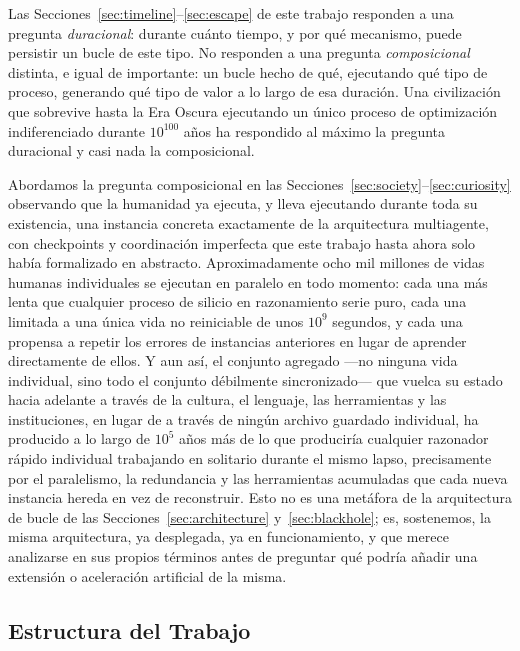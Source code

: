 \documentclass[11pt]{article}
\begin{document}
Las Secciones~\ref{sec:timeline}--\ref{sec:escape} de este trabajo responden a una pregunta \emph{duracional}: durante cuánto tiempo, y por qué mecanismo, puede persistir un bucle de este tipo. No responden a una pregunta \emph{composicional} distinta, e igual de importante: un bucle hecho de qué, ejecutando qué tipo de proceso, generando qué tipo de valor a lo largo de esa duración. Una civilización que sobrevive hasta la Era Oscura ejecutando un único proceso de optimización indiferenciado durante $10^{100}$ años ha respondido al máximo la pregunta duracional y casi nada la composicional.

Abordamos la pregunta composicional en las Secciones~\ref{sec:society}--\ref{sec:curiosity} observando que la humanidad ya ejecuta, y lleva ejecutando durante toda su existencia, una instancia concreta exactamente de la arquitectura multiagente, con checkpoints y coordinación imperfecta que este trabajo hasta ahora solo había formalizado en abstracto. Aproximadamente ocho mil millones de vidas humanas individuales se ejecutan en paralelo en todo momento: cada una más lenta que cualquier proceso de silicio en razonamiento serie puro, cada una limitada a una única vida no reiniciable de unos $10^9$ segundos, y cada una propensa a repetir los errores de instancias anteriores en lugar de aprender directamente de ellos. Y aun así, el conjunto agregado —no ninguna vida individual, sino todo el conjunto débilmente sincronizado— que vuelca su estado hacia adelante a través de la cultura, el lenguaje, las herramientas y las instituciones, en lugar de a través de ningún archivo guardado individual, ha producido a lo largo de $10^5$ años más de lo que produciría cualquier razonador rápido individual trabajando en solitario durante el mismo lapso, precisamente por el paralelismo, la redundancia y las herramientas acumuladas que cada nueva instancia hereda en vez de reconstruir. Esto no es una metáfora de la arquitectura de bucle de las Secciones~\ref{sec:architecture} y~\ref{sec:blackhole}; es, sostenemos, la misma arquitectura, ya desplegada, ya en funcionamiento, y que merece analizarse en sus propios términos antes de preguntar qué podría añadir una extensión o aceleración artificial de la misma.

\subsection{Estructura del Trabajo}
\end{document}

